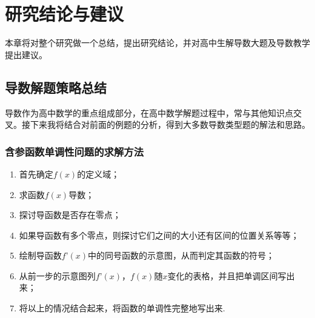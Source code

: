 \chapter{研究结论与建议}

本章将对整个研究做一个总结，提出研究结论，并对高中生解导数大题及导数教学提出建议。


\section{导数解题策略总结}

导数作为高中数学的重点组成部分，在高中数学解题过程中，常与其他知识点交叉。接下来我将结合对前面的例题的分析，得到大多数导数类型题的解法和思路。

  \subsection{含参函数单调性问题的求解方法}
    \begin{enumerate}[(1)]
      \item 首先确定$f(x)$的定义域；
      \item 求函数$f(x)$导数；
      \item 探讨导函数是否存在零点；
      \item 如果导函数有多个零点，则探讨它们之间的大小还有区间的位置关系等等；
      \item 绘制导函数$f’(x)$中的同号函数的示意图，从而判定其函数的符号；
      \item 从前一步的示意图列$f’(x)$，$f(x)$随$x$变化的表格，并且把单调区间写出来；
      \item 将以上的情况结合起来，将函数的单调性完整地写出来\cite{闫伟2015高中数学}.
    \end{enumerate}

